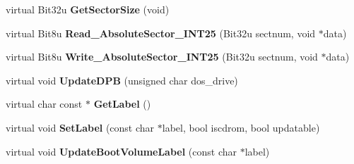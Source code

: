 \begin{DoxyCompactItemize}
\item 
\hypertarget{classfatDrive_ae5e0569a9aaf93936cd6e10d393ac458}{virtual Bit32u {\bfseries Get\-Sector\-Size} (void)}\label{classfatDrive_ae5e0569a9aaf93936cd6e10d393ac458}

\item 
\hypertarget{classfatDrive_a32675e2309c76b1433827bc84449c080}{virtual Bit8u {\bfseries Read\-\_\-\-Absolute\-Sector\-\_\-\-I\-N\-T25} (Bit32u sectnum, void $\ast$data)}\label{classfatDrive_a32675e2309c76b1433827bc84449c080}

\item 
\hypertarget{classfatDrive_abc3063d8c0750657c05fea9f1591b5b0}{virtual Bit8u {\bfseries Write\-\_\-\-Absolute\-Sector\-\_\-\-I\-N\-T25} (Bit32u sectnum, void $\ast$data)}\label{classfatDrive_abc3063d8c0750657c05fea9f1591b5b0}

\item 
\hypertarget{classfatDrive_a454ea0d8d8d235cb56b79854608342db}{virtual void {\bfseries Update\-D\-P\-B} (unsigned char dos\-\_\-drive)}\label{classfatDrive_a454ea0d8d8d235cb56b79854608342db}

\item 
\hypertarget{classfatDrive_ada5c0b37156b6bd321abd7df5aeb5c9c}{virtual char const $\ast$ {\bfseries Get\-Label} ()}\label{classfatDrive_ada5c0b37156b6bd321abd7df5aeb5c9c}

\item 
\hypertarget{classfatDrive_ac30ac6871b0c1e0e60d2a4dda761fd1d}{virtual void {\bfseries Set\-Label} (const char $\ast$label, bool iscdrom, bool updatable)}\label{classfatDrive_ac30ac6871b0c1e0e60d2a4dda761fd1d}

\item 
\hypertarget{classfatDrive_ae44dc4ad74a126a3dee16c68a25dbb60}{virtual void {\bfseries Update\-Boot\-Volume\-Label} (const char $\ast$label)}\label{classfatDrive_ae44dc4ad74a126a3dee16c68a25dbb60}

\end{DoxyCompactItemize}
